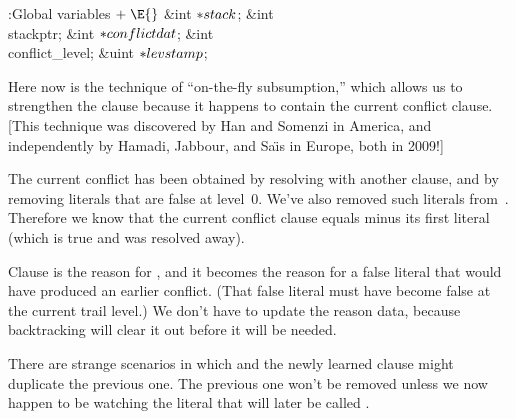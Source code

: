 \B{}:Global variables\X${}\mathrel+\E{}$\6
\&{int} ${}{*}\\{stack}{}$;\6
\&{int} \\{stackptr};\6
\&{int} ${}{*}\\{conflictdat}{}$;\6
\&{int} \\{conflict\_level};%
\6
\&{uint} ${}{*}\\{levstamp}{}$;\par
\fi

Here now is the technique of ``on-the-fly subsumption,'' which allows us
to strengthen the clause  because it happens to contain the current
conflict clause.
[This technique was discovered by Han and Somenzi in America, and
independently by Hamadi, Jabbour, and Sa{\"\i}s in Europe,
both in 2009!]

The current conflict has been obtained by resolving  with another
clause,
and by removing literals that are false at level~0. We've also removed
such literals from~. Therefore we know that the current conflict clause
equals  minus its first literal (which is true and was resolved away).

Clause  is the reason for , and it becomes the reason for a
false literal that would have produced an earlier conflict.
(That false literal must have become false at the current trail level.)
We don't have to update the reason data, because backtracking will
clear it out before it will be needed.

There are strange scenarios in which  and the
newly
learned clause might duplicate the previous one. The previous one
won't be removed unless we now happen to be watching the literal that will
later be called .

